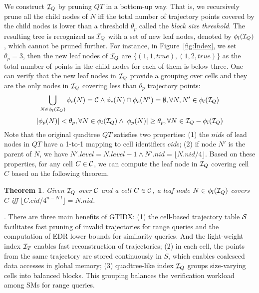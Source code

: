 \documentclass[10pt,conference,letterpaper]{IEEEtran}
\newcommand{\idxname}{GTIDX\xspace }
\newcommand{\allcell}{{\cal C}\xspace}
\newcommand{\trajtable}{{\cal S}\xspace}
\newcommand{\trajindex}{{{\cal I}_T}\xspace}
\newcommand{\treeindex}{{{\cal I}_Q}\xspace}
\newtheorem{theorem}{Theorem}
\begin{document}
We construct $\treeindex$ by pruning $QT$ in a bottom-up way. That is, we recursively prune all the child nodes of $N$ iff the total number of trajectory points covered by the child nodes is lower than a threshold $\theta_p$ called the \emph{block size threshold}. The resulting tree is recognized as $\treeindex$ with a set of new leaf nodes, denoted by $\phi_l(\treeindex)$, which cannot be pruned further. For instance, in Figure~\ref{fig:Index}, we set $\theta_p=3$, then the new leaf nodes of $\treeindex$ are $\{(1,1,true),(1,2,true)\}$ as the total number of points in the child nodes for each of them is below three. One can verify that the new leaf nodes in $\treeindex$ provide a grouping over cells and they are the only nodes in $\treeindex$ covering less than $\theta_p$ trajectory points:
\begin{equation}\label{eq:cond1}
\small
\bigcup_{N\in\phi_l(\treeindex)} {\phi_c(N)}= \allcell  \wedge \phi_c(N)\cap \phi_c(N') = \emptyset, \forall N, N'\in\phi_l(\treeindex)
\end{equation}
\begin{equation}\label{eq:cond2}
\small
|\phi_p(N)| < \theta_p, \forall N\in\phi_l(\treeindex) \wedge
|\phi_p(N)| \geq \theta_p, \forall N\in \treeindex-\phi_l(\treeindex)
\end{equation}
%
Note that the original quadtree $QT$ satisfies two properties: (1) the $nid$s of lead nodes in $QT$ have a 1-to-1 mapping to cell identifiers $cid$s; (2) if node $N'$ is the parent of $N$, we have $N'.level = N.level-1 \wedge N'.nid =  \lfloor N.nid/4 \rfloor$.
Based on these properties, for any cell $C\in\allcell$, we can compute the leaf node in $\treeindex$ covering cell $C$ based on the following theorem.
%
\begin{theorem}\label{le:findleaf}
	Given $\treeindex$ over $\allcell$ and a cell $C\in\allcell$, a leaf node $N\in \phi_l(\treeindex)$ covers $C$ iff $\lfloor C.cid/4^{n-N.l}\rfloor = N.nid$.	
\end{theorem}




\vspace{0.1cm}{\bf Benefits of \idxname}.
There are three main benefits of \idxname:
%
(1) the cell-based trajectory table $\trajtable$ facilitates fast pruning of invalid trajectories for range queries and the computation of EDR lower bounds for similarity queries. And the light-weight index $\trajindex$ enables fast reconstruction of trajectories;
(2) in each cell, the points from the same trajectory are stored continuously in $S$, which enables coalesced data accesses in global memory;
(3) quadtree-like index $\treeindex$ groups size-varying cells into balanced blocks. This grouping balances the verification workload among SMs for range queries.
\end{document}
